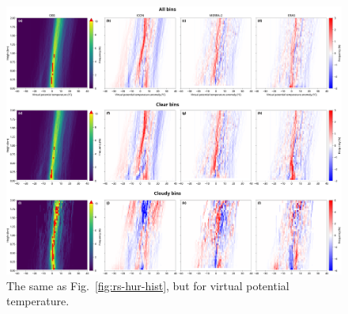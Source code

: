 \documentclass[draft,jgrga]{agutexSI2019}
\begin{document}
\begin{figure}[t]
\centerline{
\includegraphics[width=1.2\textwidth]{img/rs_thetav_hist.png}
}
\caption{
The same as Fig.~\ref{fig:rs-hur-hist}, but for virtual potential temperature.
}
\label{fig:rs-thetav-hist}
\end{figure}
\end{document}
